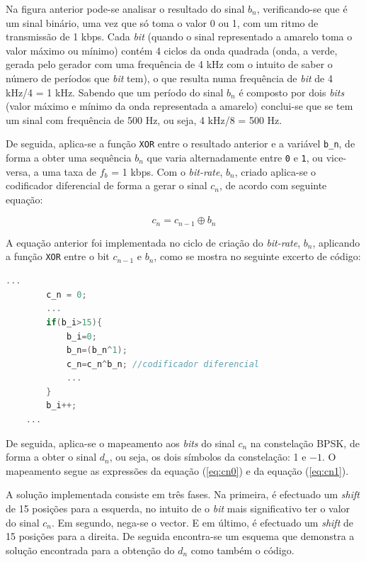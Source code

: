 \documentclass[11pt]{article}
\numberwithin{equation}{section}
\begin{document}
Na figura anterior pode-se analisar o resultado do sinal $b_n$, verificando-se que é um sinal binário, uma vez que só toma o valor 0 ou 1, com um ritmo de transmissão de 1 kbps. Cada \textit{bit} (quando o sinal representado a amarelo toma o valor máximo ou mínimo) contém 4 ciclos da onda quadrada (onda, a verde,  gerada pelo gerador com uma frequência de 4 kHz com o intuito de saber o número de períodos que \textit{bit} tem), o que resulta numa frequência de \textit{bit} de 4 kHz/4 = 1 kHz. Sabendo que um período do sinal $b_n$ é composto por dois \textit{bits} (valor máximo e mínimo da onda representada a amarelo) conclui-se que se tem um sinal com frequência de 500 Hz, ou seja, 4 kHz/8 = 500 Hz.

De seguida, aplica-se a função \texttt{XOR} entre o resultado anterior e a variável \texttt{b\_n}, de forma a obter uma sequência $b_n$ que varia alternadamente entre \texttt{0} e \texttt{1}, ou vice-versa, a uma taxa de $f_b$ = 1 kbps. Com o \textit{bit-rate}, $b_n$, criado aplica-se o codificador diferencial de forma a gerar o sinal $c_n$, de acordo com seguinte equação:

\vspace{-3mm}
\begin{equation}
	c_n = c_{n-1} \oplus b_n
\end{equation} 

\vspace{1mm}
A equação anterior foi implementada no ciclo de criação do \textit{bit-rate}, $b_n$,  aplicando a função \texttt{XOR} entre o bit $c_{n-1}$ e $b_n$, como se mostra no seguinte excerto de código:

\begin{lstlisting}[language=C]
	...
		c_n = 0;
		...
		if(b_i>15){
			b_i=0;
			b_n=(b_n^1);
			c_n=c_n^b_n; //codificador diferencial
			...
		}
		b_i++;
	...
\end{lstlisting}
		
De seguida, aplica-se o mapeamento aos \textit{bits} do sinal $c_n$ na constelação BPSK, de forma a obter o sinal $d_n$, ou seja, os dois símbolos da constelação: 1 e $-1$. O mapeamento segue as expressões da equação (\ref{eq:cn0}) e da equação (\ref{eq:cn1}).
	 
A solução implementada consiste em três fases. Na primeira, é efectuado um \textit{shift} de 15 posições para a esquerda, no intuito de o \textit{bit} mais significativo ter o valor do sinal $c_n$. Em segundo, nega-se o vector. E em último, é efectuado um \textit{shift} de 15 posições para a direita. De seguida encontra-se um esquema que demonstra a solução encontrada para a obtenção do $d_n$ como também o código.
\end{document}

